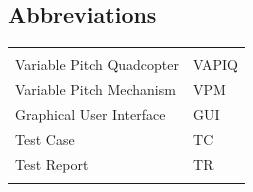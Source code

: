 \documentclass{article}
\begin{document}
\vspace*{0.5 cm}
\begin{center}
\section*{\textbf{Abbreviations}}
\begin{tabular}{ll}
\rowcolor{cadetgrey}
    &   \\
Variable Pitch Quadcopter & VAPIQ\\\rowcolor{gainsboro}
Variable Pitch Mechanism & VPM \\
Graphical User Interface & GUI \\ \rowcolor{gainsboro}
Test Case & TC \\
Test Report &TR \\ \rowcolor{gainsboro}

\end{tabular}                                                             
\end{center}


\newpage


\tableofcontents
\listoffigures
\listoftables
\newpage













\end{document}
